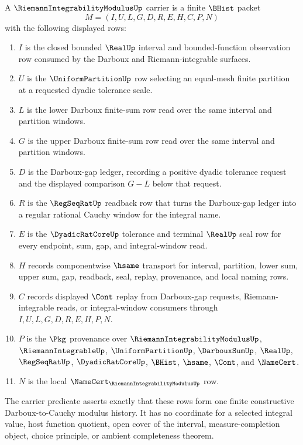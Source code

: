 \begin{definition}
\label{def:riemann-integrability-modulus-carrier}
A $\RiemannIntegrabilityModulusUp$ carrier is a finite $\BHist$ packet
$$
M=(I,U,L,G,D,R,E,H,C,P,N)
$$
with the following displayed rows:
\begin{enumerate}
\item $I$ is the closed bounded $\RealUp$ interval and bounded-function observation row consumed by the Darboux and Riemann-integrable surfaces.
\item $U$ is the $\UniformPartitionUp$ row selecting an equal-mesh finite partition at a requested dyadic tolerance scale.
\item $L$ is the lower Darboux finite-sum row read over the same interval and partition windows.
\item $G$ is the upper Darboux finite-sum row read over the same interval and partition windows.
\item $D$ is the Darboux-gap ledger, recording a positive dyadic tolerance request and the displayed comparison $G-L$ below that request.
\item $R$ is the $\RegSeqRatUp$ readback row that turns the Darboux-gap ledger into a regular rational Cauchy window for the integral name.
\item $E$ is the $\DyadicRatCoreUp$ tolerance and terminal $\RealUp$ seal row for every endpoint, sum, gap, and integral-window read.
\item $H$ records componentwise $\hsame$ transport for interval, partition, lower sum, upper sum, gap, readback, seal, replay, provenance, and local naming rows.
\item $C$ records displayed $\Cont$ replay from Darboux-gap requests, Riemann-integrable reads, or integral-window consumers through $I,U,L,G,D,R,E,H,P,N$.
\item $P$ is the $\Pkg$ provenance over $\RiemannIntegrabilityModulusUp$, $\RiemannIntegrableUp$, $\UniformPartitionUp$, $\DarbouxSumUp$, $\RealUp$, $\RegSeqRatUp$, $\DyadicRatCoreUp$, $\BHist$, $\hsame$, $\Cont$, and $\NameCert$.
\item $N$ is the local $\NameCert_{\RiemannIntegrabilityModulusUp}$ row.
\end{enumerate}
The carrier predicate asserts exactly that these rows form one finite constructive Darboux-to-Cauchy modulus history. It has no coordinate for a selected integral value, host function quotient, open cover of the interval, measure-completion object, choice principle, or ambient completeness theorem.
\end{definition}

